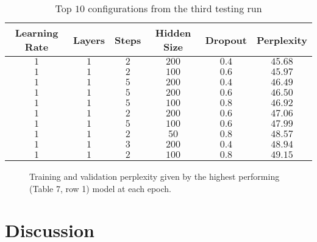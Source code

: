 \documentclass[a4paper]{article}
\begin{document}
\begin{table}[h]
 \caption{Top $10$ configurations from the third testing run}
 \label{table}
 \begin{center}
  \begin{tabular}{ccccc|c}
    \hline \hline
    Learning Rate & Layers & Steps & Hidden Size & Dropout & Perplexity \\
    \hline
        $1$ & $1$ & $2$ & $200$ & $0.4$ & $45.68$ \\
        $1$ & $1$ & $2$ & $100$ & $0.6$ & $45.97$ \\
        $1$ & $1$ & $5$ & $200$ & $0.4$ & $46.49$ \\
        $1$ & $1$ & $5$ & $200$ & $0.6$ & $46.50$ \\
        $1$ & $1$ & $5$ & $100$ & $0.8$ & $46.92$ \\
        $1$ & $1$ & $2$ & $200$ & $0.6$ & $47.06$ \\
        $1$ & $1$ & $5$ & $100$ & $0.6$ & $47.99$ \\
        $1$ & $1$ & $2$ & $50$ & $0.8$ & $48.57$ \\
        $1$ & $1$ & $3$ & $200$ & $0.4$ & $48.94$ \\
        $1$ & $1$ & $2$ & $100$ & $0.8$ & $49.15$ \\
    \hline
  \end{tabular}
 \end{center}
\end{table}


\begin{figure}[h]
\label{figure}
\centering
{} 
\caption{Training and validation perplexity given by the highest performing (Table 7, row 1) model
at each epoch.}
\label{english-frequency}
\end{figure}

\section{Discussion}
\end{document}

